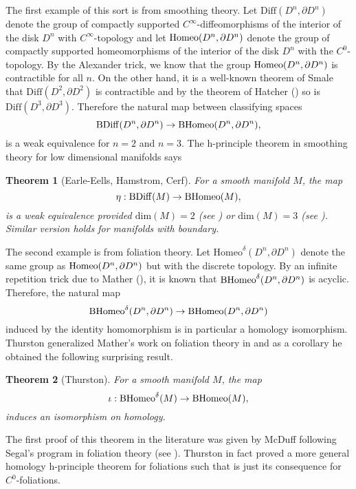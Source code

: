 \documentclass[a4paper]{amsart}
\newtheorem{thm}{Theorem}[section]
\theoremstyle{definition}
\theoremstyle{remark}
\newcommand\Diff{\mathrm{Diff}}
\newcommand\BDiff{\mathrm{BDiff}}
\newcommand{\tH}{\text{\textnormal{Homeo}}}
\newcommand{\BH}{\mathrm{B}\text{\textnormal{Homeo}}}
\newcommand{\tdH}{\text{Homeo}^{\delta}}
\newcommand{\BdH}{\mathrm{B}\text{\textnormal{Homeo}}^{\delta}}
\numberwithin{equation}{section}
\begin{document}
The first example of this sort is from  smoothing theory. Let $\Diff(D^n,\partial D^n)$  denote the group of compactly supported $C^{\infty}$-diffeomorphisms of the interior of the disk $D^n$ with $C^{\infty}$-topology and let $\tH(D^n,\partial D^n)$ denote the group of compactly supported homeomorphisms of the interior of the disk $D^n$ with the $C^0$-topology. By the Alexander trick, we know that the group $\tH(D^n,\partial D^n)$  is  contractible for all $n$. On the other hand, it is a well-known theorem of Smale that $\Diff(D^2,\partial D^2)$ is contractible and by the  theorem of Hatcher (\cite{hatcher1983proof}) so is $\Diff(D^3,\partial D^3)$. Therefore the natural map between classifying spaces
\[
\BDiff(D^n,\partial D^n)\to \BH(D^n,\partial D^n),
\]
is a weak equivalence for $n=2$ and $n=3$. The h-principle theorem in  smoothing theory for low dimensional manifolds says 
\begin{thm}[Earle-Eells, Hamstrom, Cerf]\label{sm} For a smooth manifold $M$, the map
\begin{equation}\label{BL}
\eta: \BDiff(M)\to \BH(M),
\end{equation}
is a weak equivalence provided $\text{dim}(M)=2$ (see \cite{hamstrom1974homotopy}) or $\text{dim}(M)=3$ (see \cite{cerf1961topologie}). Similar version holds for manifolds with boundary.
\end{thm}
 The second example is from foliation theory. Let $\tdH(D^n,\partial D^n)$ denote  the same group as $\tH(D^n,\partial D^n)$ but with the discrete topology. By an infinite repetition trick due to   Mather (\cite{MR0288777}), it is known that $\BdH(D^n,\partial D^n)$ is acyclic. Therefore, the natural map
 \[
 \BdH(D^n,\partial D^n)\to \BH(D^n,\partial D^n)
 \]
 induced by the identity homomorphism is in particular a homology isomorphism. Thurston generalized Mather's work on foliation theory in \cite{thurston1974foliations} and as a corollary he obtained  the following surprising result.
   \begin{thm}[Thurston]\label{Main}
  For a  smooth manifold $M$, the map 
  \[
  \iota: \BdH(M)\to \BH(M),
  \]
  induces an isomorphism on homology.
  \end{thm}
The first  proof of this theorem in the literature was given by McDuff following Segal's program in  foliation theory (see \cite{mcduff1980homology}). Thurston in fact proved a more general homology h-principle theorem for foliations such that  is just its consequence for $C^0$-foliations. 
\end{document}
